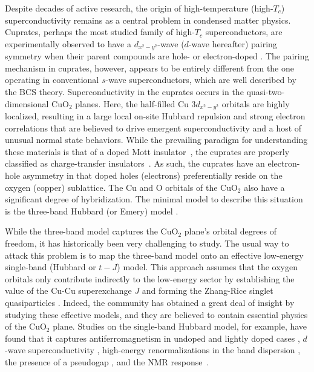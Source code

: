 \documentclass[reprint,nofootinbib,nobibnotes,amsmath,amssymb,aps,prb,floatfix]{revtex4-2}
\begin{document}
Despite decades of active research, the origin of high-temperature (high-$T_c$) superconductivity remains as a central problem in condensed matter physics. Cuprates, perhaps the most studied family of high-$T_c$ superconductors, are experimentally observed to have a $d_{x^2-y^2}$-wave ($d$-wave hereafter) pairing symmetry when their parent compounds are hole- or electron-doped \cite{Kirtley}. The pairing mechanism in cuprates, however, appears to be entirely different \cite{LeeRMP2006, ScalapinoRMP2012} from the one operating in conventional $s$-wave superconductors, which are well described by the BCS theory. Superconductivity in the cuprates occurs in the quasi-two-dimensional CuO$_2$ planes. Here, the half-filled Cu $3d_{x^2-y^2}$ orbitals are highly localized, resulting in a large local on-site Hubbard repulsion and strong electron correlations that are believed to drive emergent superconductivity and a host of unusual normal state behaviors. 
While the prevailing paradigm for understanding these materials is that of a doped Mott insulator~\cite{LeeRMP2006}, the cuprates are properly classified as charge-transfer insulators~\cite{ZSA}. As such, the cuprates have an electron-hole asymmetry in that doped holes (electrons) preferentially reside on the oxygen (copper) sublattice. The Cu and O orbitals of the CuO$_2$ also have a significant degree of hybridization. The minimal model to describe this situation is the three-band Hubbard (or Emery) model \cite{Emery}. 

While the three-band model captures the CuO$_2$ plane's orbital degrees of freedom, it has historically been very challenging to study. The usual way to attack this problem is to map the three-band model onto an effective low-energy single-band (Hubbard or $t-J$) model. This approach assumes that the oxygen orbitals only contribute indirectly to the low-energy sector by establishing the value of the Cu-Cu superexchange $J$ and forming the Zhang-Rice singlet quasiparticles \cite{ZR}. Indeed, the community has obtained a great deal of insight by studying these effective models, and they are believed to contain essential physics of the CuO$_2$ plane. Studies on the single-band Hubbard model, for example, have found that it captures antiferromagnetism in undoped \cite{WhitePRB1989} and lightly doped cases \cite{Dagotto}, $d$-wave superconductivity \cite{Maier2}, high-energy renormalizations in the band dispersion \cite{Macridin2007, Moritz2009}, the presence of a pseudogap \cite{Gull2009}, and the NMR response~\cite{Chen2017}. 
\end{document}
